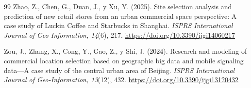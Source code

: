 \documentclass[10pt,letterpaper,twocolumn]{article}
\begin{document}
\begin{thebibliography}{99}
 Zhao, Z., Chen, G., Duan, J., y Xu, Y. (2025). Site selection analysis and prediction of new retail stores from an urban commercial space perspective: A case study of Luckin Coffee and Starbucks in Shanghai. \textit{ISPRS International Journal of Geo-Information, 14}(6), 217. \url{https://doi.org/10.3390/ijgi14060217}

 Zou, J., Zhang, X., Cong, Y., Gao, Z., y Shi, J. (2024). Research and modeling of commercial location selection based on geographic big data and mobile signaling data---A case study of the central urban area of Beijing. \textit{ISPRS International Journal of Geo-Information, 13}(12), 432. \url{https://doi.org/10.3390/ijgi13120432}

\end{thebibliography}
\end{document}
